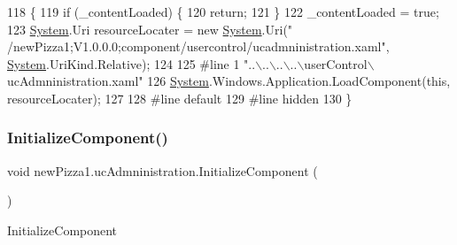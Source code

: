 \begin{DoxyCode}
118                                           \{
119             \textcolor{keywordflow}{if} (\_contentLoaded) \{
120                 \textcolor{keywordflow}{return};
121             \}
122             \_contentLoaded = \textcolor{keyword}{true};
123             \hyperlink{namespaceSystem}{System}.Uri resourceLocater = \textcolor{keyword}{new} \hyperlink{namespaceSystem}{System}.Uri(\textcolor{stringliteral}{"
      /newPizza1;V1.0.0.0;component/usercontrol/ucadmninistration.xaml"}, \hyperlink{namespaceSystem}{System}.UriKind.Relative);
124             
125 \textcolor{preprocessor}{            #line 1 "..\(\backslash\)..\(\backslash\)..\(\backslash\)..\(\backslash\)userControl\(\backslash\)ucAdmninistration.xaml"
}
126             \hyperlink{namespaceSystem}{System}.Windows.Application.LoadComponent(\textcolor{keyword}{this}, resourceLocater);
127             
128 \textcolor{preprocessor}{            #line default
}
129 \textcolor{preprocessor}{            #line hidden
}
130         \}
\end{DoxyCode}
\mbox{\label{classnewPizza1_1_1ucAdmninistration_a500966f5d66cf50194a823a88df8517e}} 
\subsubsection{\texorpdfstring{Initialize\+Component()}{InitializeComponent()}\hspace{0.1cm}{\footnotesize\ttfamily [4/5]}}
{\footnotesize\ttfamily void new\+Pizza1.\+uc\+Admninistration.\+Initialize\+Component (\begin{DoxyParamCaption}{ }\end{DoxyParamCaption})\hspace{0.3cm}{\ttfamily [inline]}}



Initialize\+Component 


